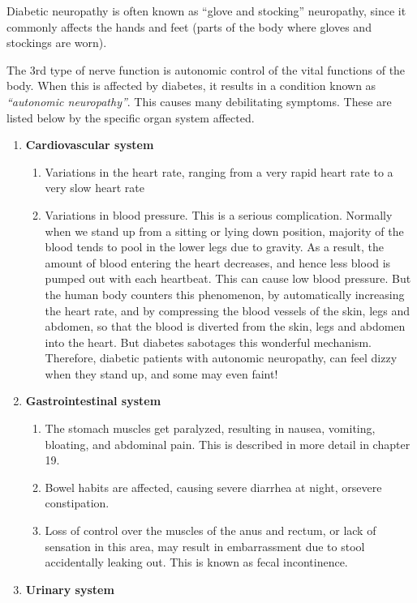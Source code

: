 Diabetic neuropathy is often known as “glove and stocking” neuropathy, since it commonly affects the hands and feet (parts of the body where gloves and stockings are worn).

The 3rd type of nerve function is autonomic control of the vital functions of the body. When this is affected by diabetes, it results in a condition known as \textit{“autonomic neuropathy”}. This causes many debilitating symptoms. These are listed below by the specific organ system affected.
\begin{enumerate}[•]
\itemsep=0pt
\item \textbf{Cardiovascular system}
\begin{enumerate}[o]
\itemsep=0pt
\item Variations in the heart rate, ranging from a very rapid heart rate to a very slow heart rate
\item Variations in blood pressure. This is a serious complication. Normally when we stand up from a sitting or lying down position, majority of the blood tends to pool in the lower legs due to gra\-vity. As a result, the amount of blood entering the heart decreases, and hence less blood is pumped out with each heartbeat. This can cause low blood pressure. But the human body counters this pheno\-menon, by automatically increasing the heart rate, and by compressing the blood vessels of the skin, legs and abdomen, so that the blood is diverted from the skin, legs and abdomen into the heart. But diabetes sabotages this wonderful mechanism. Therefore, diabetic patients with autonomic neuropathy, can feel dizzy when they stand up, and some may even faint!
\end{enumerate}
\item \textbf{Gastrointestinal system}
\begin{enumerate}[o]
\itemsep=0pt
\item The stomach muscles get paralyzed, resulting in nausea, vomiting, bloating, and abdominal pain. This is described in more detail in chapter 19.
\item Bowel habits are affected, causing severe diarrhea at night, or\break severe constipation.
\item Loss of control over the muscles of the anus and rectum, or lack of sensation in this area, may result in embarrassment due to stool accidentally leaking out. This is known as fecal incontinence.
\end{enumerate}
\item \textbf{Urinary system}
\begin{enumerate}[o]

\end{enumerate}
\end{enumerate}
